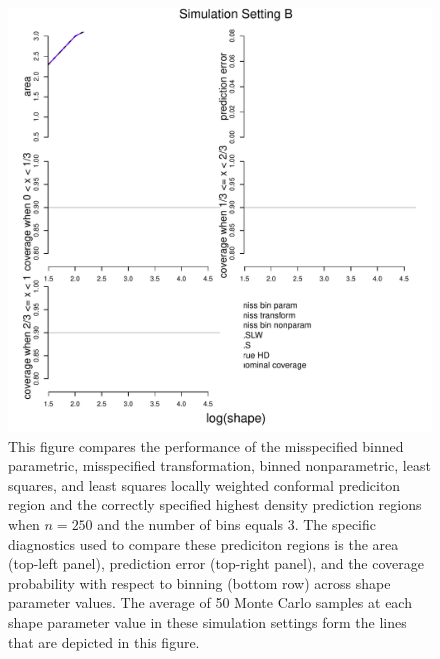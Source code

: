 \documentclass[11pt]{article}\usepackage[]{graphicx}\usepackage[]{color}
\makeatletter
\def\maxwidth{ %
  \ifdim\Gin@nat@width>\linewidth
    \linewidth
  \else
    \Gin@nat@width
  \fi
}
\newenvironment{knitrout}{}{} %
\makeatother
\begin{document}
\newpage
\begin{figure}[h!]
\begin{center}
\begin{knitrout}
\color{fgcolor}
\includegraphics[width=\maxwidth]{figure/Fig-misspec-250-1} 

\end{knitrout}
\end{center}
\caption{This figure compares the performance of the 
  misspecified binned parametric,
  misspecified transformation, 
  binned nonparametric,
  least squares, and 
  least squares locally weighted conformal prediciton region and the 
  correctly specified highest density prediction regions when $n = 250$ 
  and the number of bins equals 3.  
  The specific diagnostics used to compare these prediciton regions is the 
    area (top-left panel),
    prediction error (top-right panel), and
    the coverage probability with respect to binning (bottom row) 
    across shape parameter values.
  The average of 50 Monte Carlo samples at each shape parameter value in 
  these simulation settings form the lines that are depicted in this figure.}
\label{Fig:misspec.250}
\end{figure}
\end{document}
